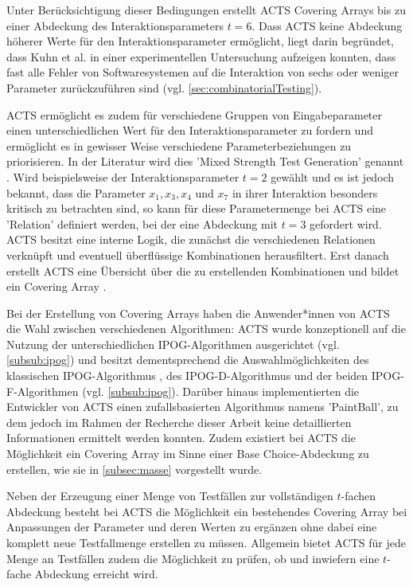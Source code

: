 Unter Berücksichtigung dieser Bedingungen erstellt ACTS Covering Arrays bis zu einer Abdeckung des Interaktionsparameters $t = 6$. Dass ACTS keine Abdeckung höherer Werte für den Interaktionsparameter ermöglicht, liegt darin begründet, dass Kuhn et al. \cite{kuhn2004error} in einer experimentellen Untersuchung aufzeigen konnten, dass fast alle Fehler von Softwaresystemen auf die Interaktion von sechs oder weniger Parameter zurückzuführen sind (vgl. \autoref{sec:combinatorialTesting}). 

ACTS ermöglicht es zudem für verschiedene Gruppen von Eingabeparameter einen unterschiedlichen Wert für den Interaktionsparameter zu fordern und ermöglicht es in gewisser Weise verschiedene Parameterbeziehungen zu priorisieren. In der Literatur wird dies 'Mixed Strength Test Generation' genannt \cite{yu2013acts, czerwonka2006pairwise}. Wird beispielsweise der Interaktionsparameter $t = 2$ gewählt und es ist jedoch bekannt, dass die Parameter $x_1, x_3, x_4$ und $x_7$ in ihrer Interaktion besonders kritisch zu betrachten sind, so kann für diese Parametermenge bei ACTS eine 'Relation' \cite{yu2013acts} definiert werden, bei der eine Abdeckung mit $t = 3$ gefordert wird. ACTS besitzt eine interne Logik, die zunächst die verschiedenen Relationen verknüpft und eventuell überflüssige Kombinationen herausfiltert. Erst danach erstellt ACTS eine Übersicht über die zu erstellenden Kombinationen und bildet ein Covering Array \cite{yu2013acts}.
  
Bei der Erstellung von Covering Arrays haben die Anwender*innen von ACTS die Wahl zwischen verschiedenen Algorithmen: ACTS wurde konzeptionell auf die Nutzung der unterschiedlichen IPOG-Algorithmen ausgerichtet (vgl. \autoref{subsub:ipog}) und besitzt dementsprechend die Auswahlmöglichkeiten des klassischen IPOG-Algorithmus \cite{lei2008ipog}, des IPOG-D-Algorithmus \cite{lei2008ipog} und der beiden IPOG-F-Algorithmen \cite{forbes2008refining} (vgl. \autoref{subsub:ipog}). Darüber hinaus implementierten die Entwickler von ACTS einen zufallsbasierten Algorithmus namens 'PaintBall', zu dem jedoch im Rahmen der Recherche dieser Arbeit keine detaillierten Informationen ermittelt werden konnten. Zudem existiert bei ACTS die Möglichkeit ein Covering Array im Sinne einer Base Choice-Abdeckung zu erstellen, wie sie in \autoref{subsec:masse} vorgestellt wurde.

Neben der Erzeugung einer Menge von Testfällen zur vollständigen $t$-fachen Abdeckung besteht bei ACTS die Möglichkeit ein bestehendes Covering Array bei Anpassungen der Parameter und deren Werten zu ergänzen ohne dabei eine komplett neue Testfallmenge erstellen zu müssen. Allgemein bietet ACTS für jede Menge an Testfällen zudem die Möglichkeit zu prüfen, ob und inwiefern eine $t$-fache Abdeckung erreicht wird.

